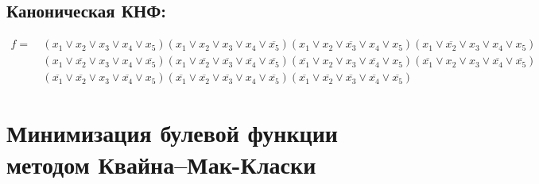 \documentclass{article}
\begin{document}
\subsection*{Каноническая КНФ:}
\begin{align*}
f =\: &\left(x_{1} \lor x_{2} \lor x_{3} \lor x_{4} \lor x_{5}\right)\left(x_{1} \lor x_{2} \lor x_{3} \lor x_{4} \lor \overline{x_{5}}\right)\left(x_{1} \lor x_{2} \lor \overline{x_{3}} \lor x_{4} \lor x_{5}\right)\left(x_{1} \lor \overline{x_{2}} \lor x_{3} \lor x_{4} \lor x_{5}\right)\\&\left(x_{1} \lor \overline{x_{2}} \lor x_{3} \lor x_{4} \lor \overline{x_{5}}\right)\left(x_{1} \lor \overline{x_{2}} \lor \overline{x_{3}} \lor \overline{x_{4}} \lor \overline{x_{5}}\right)\left(\overline{x_{1}} \lor x_{2} \lor x_{3} \lor \overline{x_{4}} \lor x_{5}\right)\left(\overline{x_{1}} \lor x_{2} \lor x_{3} \lor \overline{x_{4}} \lor \overline{x_{5}}\right)\\&\left(\overline{x_{1}} \lor \overline{x_{2}} \lor x_{3} \lor \overline{x_{4}} \lor x_{5}\right)\left(\overline{x_{1}} \lor \overline{x_{2}} \lor \overline{x_{3}} \lor x_{4} \lor \overline{x_{5}}\right)\left(\overline{x_{1}} \lor \overline{x_{2}} \lor \overline{x_{3}} \lor \overline{x_{4}} \lor \overline{x_{5}}\right)\end{align*}
\section*{Минимизация булевой функции методом Квайна--Мак-Класки}
\end{document}

